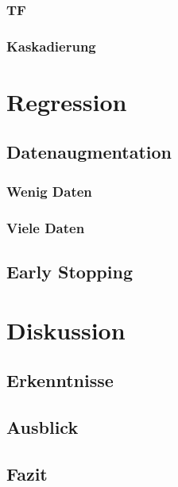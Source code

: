\documentclass[ngerman]{report}
\begin{document}
    \subsection{TF}
    \subsection{Kaskadierung}


    \chapter{Regression}  %
    \section{Datenaugmentation}
    \subsection{Wenig Daten}
    \subsection{Viele Daten}
    \section{Early Stopping}
    
    \chapter{Diskussion}  %
    \section{Erkenntnisse}
    
    \section{Ausblick}
    \section{Fazit}
    \printbibliography
\end{document}
